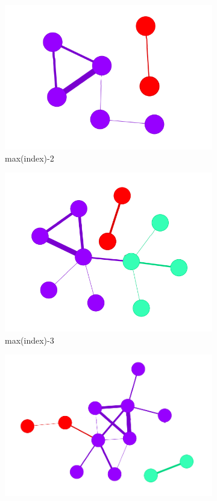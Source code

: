 \begin{figure}[!htb]
\begin{subfigure}[b]{0.15\linewidth}
		\includegraphics[width=\linewidth]{Minor Thesis/figures/graphs/nn/C.png}
		\caption{max(index)-2}
	\end{subfigure}
	\hfill
	\begin{subfigure}[b]{0.15\linewidth}
		\includegraphics[width=\linewidth]{Minor Thesis/figures/graphs/nn/D.png}
		\caption{max(index)-3}
	\end{subfigure}
	\hfill
	\begin{subfigure}[b]{0.15\linewidth}
		\includegraphics[width=\linewidth]{Minor Thesis/figures/graphs/nn/E.png}

\end{subfigure}
\end{figure}
